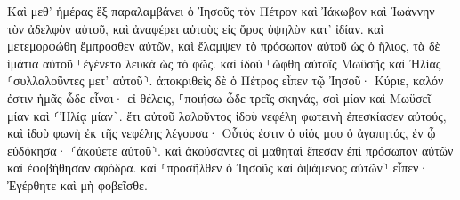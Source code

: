 \documentclass{openreader}
\begin{document}
Καὶ μεθ’ ἡμέρας ἓξ παραλαμβάνει ὁ Ἰησοῦς τὸν Πέτρον καὶ Ἰάκωβον καὶ Ἰωάννην τὸν ἀδελφὸν αὐτοῦ, καὶ ἀναφέρει αὐτοὺς εἰς ὄρος ὑψηλὸν κατ’ ἰδίαν. 
καὶ μετεμορφώθη ἔμπροσθεν αὐτῶν, καὶ ἔλαμψεν τὸ πρόσωπον αὐτοῦ ὡς ὁ ἥλιος, τὰ δὲ ἱμάτια αὐτοῦ ⸀ἐγένετο λευκὰ ὡς τὸ φῶς. 
καὶ ἰδοὺ ⸀ὤφθη αὐτοῖς Μωϋσῆς καὶ Ἠλίας ⸂συλλαλοῦντες μετ’ αὐτοῦ⸃. 
ἀποκριθεὶς δὲ ὁ Πέτρος εἶπεν τῷ Ἰησοῦ· Κύριε, καλόν ἐστιν ἡμᾶς ὧδε εἶναι· εἰ θέλεις, ⸀ποιήσω ὧδε τρεῖς σκηνάς, σοὶ μίαν καὶ Μωϋσεῖ μίαν καὶ ⸂Ἠλίᾳ μίαν⸃. 
ἔτι αὐτοῦ λαλοῦντος ἰδοὺ νεφέλη φωτεινὴ ἐπεσκίασεν αὐτούς, καὶ ἰδοὺ φωνὴ ἐκ τῆς νεφέλης λέγουσα· Οὗτός ἐστιν ὁ υἱός μου ὁ ἀγαπητός, ἐν ᾧ εὐδόκησα· ⸂ἀκούετε αὐτοῦ⸃. 
καὶ ἀκούσαντες οἱ μαθηταὶ ἔπεσαν ἐπὶ πρόσωπον αὐτῶν καὶ ἐφοβήθησαν σφόδρα. 
καὶ ⸂προσῆλθεν ὁ Ἰησοῦς καὶ ἁψάμενος αὐτῶν⸃ εἶπεν· Ἐγέρθητε καὶ μὴ φοβεῖσθε. 
\end{document}
